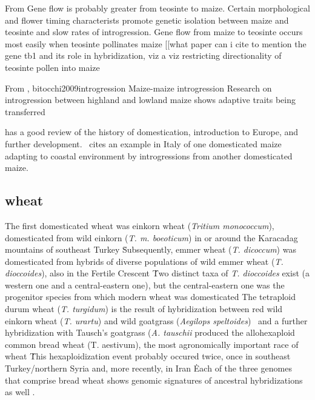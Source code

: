 \documentclass[11pt]{article}
\begin{document}
From \cite{baltazar2005pollination}
Gene flow is probably greater from teosinte to maize.
Certain morphological and flower timing characterists promote genetic isolation between maize and teosinte and slow rates of introgression.
Gene flow from maize to teosinte occurs most easily when teosinte pollinates maize
[[what paper can i cite to mention the gene tb1 and its role in hybridization, viz a viz restricting directionality of teosinte pollen into maize

From \cite{jiang1999genetic}, {bitocchi2009introgression}
Maize-maize introgression
Research on introgression between highland and lowland maize shows adaptive traits being transferred

\cite{bitocchi2009introgression} has a good review of the history of domestication, introduction to Europe, and further development.
\cite{hammer1987collection}\ cites an example in Italy of one domesticated maize adapting to coastal environment by introgressions from another domesticated maize.













\subsection*{wheat}

The first domesticated wheat was einkorn wheat (\emph{Tritium monococcum}), domesticated from wild einkorn (\emph{T. m. boeoticum}) in or around the Karacadag mountains of southeast Turkey \cite{heun1997site, harlan1966distribution, ozkan2002aflp}\.
Subsequently, emmer wheat (\emph{T. dicoccum}) was domesticated from hybrids of diverse populations of wild emmer wheat (\emph{T. dioccoides}), also in the Fertile Crescent \cite{lev2000cradle, civavn2013reticulated, luo2007structure, ozkan2002aflp}\.
Two distinct taxa of \emph{T. dioccoides} exist (a western one and a central-eastern one), but the central-eastern one was the progenitor species from which modern wheat was domesticated \cite{ozkan2005reconsideration}
The tetraploid durum wheat (\emph{T. turgidum}) is the result of hybridization between red wild einkorn wheat (\emph{T. urartu}) and wild goatgrass (\emph{Aegilops speltoides}) \cite{mcfadden1946origin, petersen2006phylogenetic}\, and a further hybridization with Tausch's goatgrass (\emph{A. tauschii} produced the allohexaploid common bread wheat (T. aestivum), the most agronomically important race of wheat \cite{salamini2002genetics, hancock2012plant, dvorak2006molecular}\.
This hexaploidization event probably occured twice, once in southeast Turkey/northern Syria and, more recently, in Iran \cite{giles2006gludy}\.
Each of the three genomes that comprise bread wheat shows genomic signatures of ancestral hybridizations as well \cite{marcussen2014ancient}.
\end{document}
